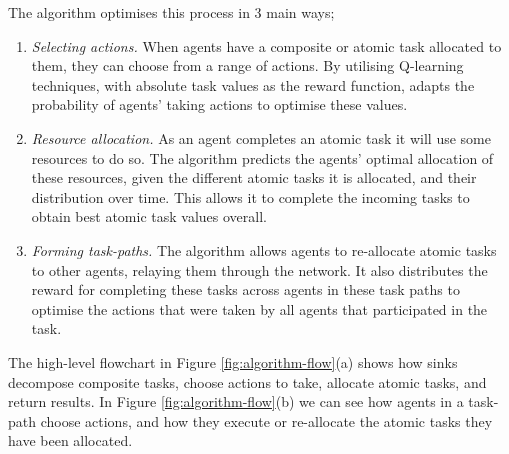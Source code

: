 The \acronymWSNOptimisation{}{} algorithm optimises this process  in 3 main ways;
\begin{enumerate}
	\item \textit{Selecting actions.} When agents have a composite or atomic task allocated to them, they can choose from a range of actions. By utilising Q-learning techniques, with absolute task values as the reward function, \acronymWSNOptimisation{}{} adapts the probability of agents' taking actions to optimise these values. 
	
	\item \textit{Resource allocation.} As an agent completes an atomic task it will use some resources to do so. The \acronymWSNOptimisation{}{} algorithm predicts the agents' optimal allocation of these resources, given the different atomic tasks it is allocated, and their distribution over time. This allows it to complete the incoming tasks to obtain best atomic task values overall.
	
	\item \textit{Forming task-paths. }The algorithm allows agents to re-allocate atomic tasks to other agents, relaying them through the network.  It also distributes the reward for completing these tasks across agents in these task paths to optimise the actions that were taken by all agents that participated in the task.
\end{enumerate}
The high-level flowchart in Figure \ref{fig:algorithm-flow}(a) shows how sinks decompose composite tasks, choose actions to take, allocate atomic tasks, and return results. In Figure \ref{fig:algorithm-flow}(b) we can see how agents in a task-path choose actions, and how they execute or re-allocate the atomic tasks they have been allocated.

